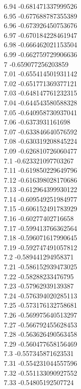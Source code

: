 {6.94	-0.681471337999526\\
6.95	-0.677688787355389\\
6.96	-0.673926450753676\\
6.97	-0.670184228461947\\
6.98	-0.666462021153504\\
6.99	-0.662759729906636\\
7	-0.659077256203859\\
7.01	-0.655414501931142\\
7.02	-0.651771369377121\\
7.03	-0.648147761232315\\
7.04	-0.644543580588328\\
7.05	-0.640958730937041\\
7.06	-0.6373931161698\\
7.07	-0.633846640576592\\
7.08	-0.630319208845224\\
7.09	-0.626810726060477\\
7.1	-0.623321097703267\\
7.11	-0.619850229649796\\
7.12	-0.616398028170686\\
7.13	-0.612964399930122\\
7.14	-0.609549251984977\\
7.15	-0.606152491783929\\
7.16	-0.60277402716658\\
7.17	-0.599413766362564\\
7.18	-0.596071617990645\\
7.19	-0.592747491057812\\
7.2	-0.589441294958371\\
7.21	-0.586152939473025\\
7.22	-0.58288233476795\\
7.23	-0.57962939139387\\
7.24	-0.576394020285113\\
7.25	-0.573176132758681\\
7.26	-0.569975640513297\\
7.27	-0.566792455628453\\
7.28	-0.563626490563458\\
7.29	-0.560477658156469\\
7.3	-0.557345871623531\\
7.31	-0.554231044557596\\
7.32	-0.551133090927552\\
7.33	-0.54805192507724\\
}
